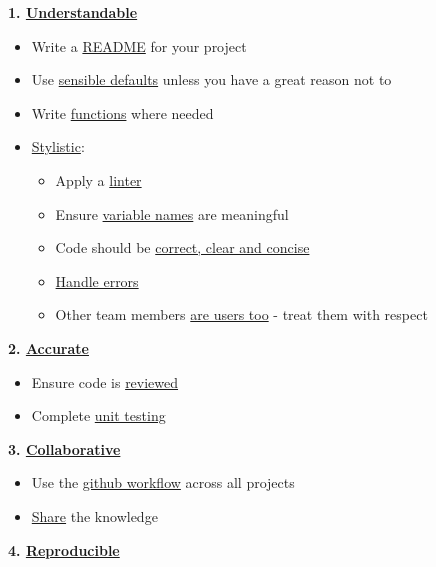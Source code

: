 \documentclass[]{book}
\providecommand{\tightlist}{%
  \setlength{\itemsep}{0pt}\setlength{\parskip}{0pt}}
\begin{document}
\textbf{1. \protect\hyperlink{understand}{Understandable}}

\begin{itemize}
\tightlist
\item
  Write a \protect\hyperlink{readme}{README} for your project\\
\item
  Use \protect\hyperlink{defaults}{sensible defaults} unless you have a great reason not to
\item
  Write \protect\hyperlink{functions}{functions} where needed\\
\item
  \protect\hyperlink{style}{Stylistic}:

  \begin{itemize}
  \tightlist
  \item
    Apply a \protect\hyperlink{linter}{linter}
  \item
    Ensure \protect\hyperlink{names}{variable names} are meaningful
  \item
    Code should be \protect\hyperlink{ccc}{correct, clear and concise}
  \item
    \protect\hyperlink{errors}{Handle errors}\\
  \item
    Other team members \protect\hyperlink{users}{are users too} - treat them with respect
  \end{itemize}
\end{itemize}

\textbf{2. \protect\hyperlink{accurate}{Accurate}}

\begin{itemize}
\tightlist
\item
  Ensure code is \protect\hyperlink{review}{reviewed}
\item
  Complete \protect\hyperlink{unittest}{unit testing}
\end{itemize}

\textbf{3. \protect\hyperlink{collaborate}{Collaborative}}

\begin{itemize}
\tightlist
\item
  Use the \protect\hyperlink{versioncontrol}{github workflow} across all projects\\
\item
  \protect\hyperlink{knowledge}{Share} the knowledge
\end{itemize}

\textbf{4. \protect\hyperlink{reproduce}{Reproducible}}
\end{document}
